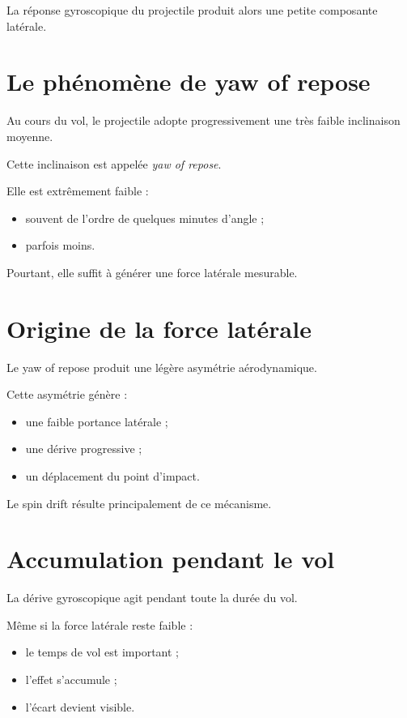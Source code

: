 La réponse gyroscopique du projectile produit alors une petite composante
latérale.

\section{Le phénomène de yaw of repose}

Au cours du vol, le projectile adopte progressivement une très faible
inclinaison moyenne.

Cette inclinaison est appelée \emph{yaw of repose}.

Elle est extrêmement faible :

\begin{itemize}
    \item souvent de l'ordre de quelques minutes d'angle ;
    \item parfois moins.
\end{itemize}

Pourtant, elle suffit à générer une force latérale mesurable.

\section{Origine de la force latérale}

Le yaw of repose produit une légère asymétrie aérodynamique.

Cette asymétrie génère :

\begin{itemize}
    \item une faible portance latérale ;
    \item une dérive progressive ;
    \item un déplacement du point d'impact.
\end{itemize}

Le spin drift résulte principalement de ce mécanisme.

\section{Accumulation pendant le vol}

La dérive gyroscopique agit pendant toute la durée du vol.

Même si la force latérale reste faible :

\begin{itemize}
    \item le temps de vol est important ;
    \item l'effet s'accumule ;
    \item l'écart devient visible.
\end{itemize}

